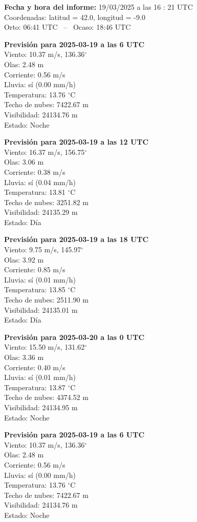 {\bf Fecha y hora del informe:} 19/03/2025 a las 16 : 21 UTC\\
Coordenadas: latitud = 42.0, longitud = -9.0\\
Orto: 06:41 UTC \, -- \, Ocaso: 18:46 UTC

{\bf Previsión para 2025-03-19 a las 6 UTC}\\
  Viento: 10.37 m/s, 136.36$^\circ$\\
  Olas: 2.48 m\\
  Corriente: 0.56 m/s\\
  Lluvia: sí (0.00 mm/h)\\
  Temperatura: 13.76 $^\circ$C\\
  Techo de nubes: 7422.67 m\\
  Visibilidad: 24134.76 m\\
  Estado: Noche

{\bf Previsión para 2025-03-19 a las 12 UTC}\\
  Viento: 16.37 m/s, 156.75$^\circ$\\
  Olas: 3.06 m\\
  Corriente: 0.38 m/s\\
  Lluvia: sí (0.04 mm/h)\\
  Temperatura: 13.81 $^\circ$C\\
  Techo de nubes: 3251.82 m\\
  Visibilidad: 24135.29 m\\
  Estado: Día

{\bf Previsión para 2025-03-19 a las 18 UTC}\\
  Viento: 9.75 m/s, 145.97$^\circ$\\
  Olas: 3.92 m\\
  Corriente: 0.85 m/s\\
  Lluvia: sí (0.01 mm/h)\\
  Temperatura: 13.85 $^\circ$C\\
  Techo de nubes: 2511.90 m\\
  Visibilidad: 24135.01 m\\
  Estado: Día

{\bf Previsión para 2025-03-20 a las 0 UTC}\\
  Viento: 15.50 m/s, 131.62$^\circ$\\
  Olas: 3.36 m\\
  Corriente: 0.40 m/s\\
  Lluvia: sí (0.01 mm/h)\\
  Temperatura: 13.87 $^\circ$C\\
  Techo de nubes: 4374.52 m\\
  Visibilidad: 24134.95 m\\
  Estado: Noche

{\bf Previsión para 2025-03-19 a las 6 UTC}\\
  Viento: 10.37 m/s, 136.36$^\circ$\\
  Olas: 2.48 m\\
  Corriente: 0.56 m/s\\
  Lluvia: sí (0.00 mm/h)\\
  Temperatura: 13.76 $^\circ$C\\
  Techo de nubes: 7422.67 m\\
  Visibilidad: 24134.76 m\\
  Estado: Noche


